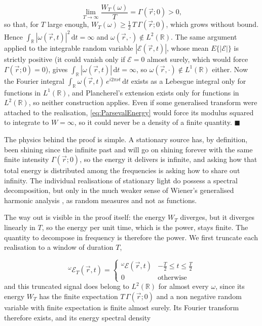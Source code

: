 		\begin{equation}
			\lim_{T\to\infty}\frac{W_{T}(\omega)}{T} = \Gamma(\vec{r};0) > 0 ,
		\end{equation}
		so that, for $T$ large enough, $W_{T}(\omega)\geq\frac{1}{2}\,T\,\Gamma(\vec{r};0)$,
		which grows without bound. Hence $\int_{\mathbb{R}}|\omega(\vec{r},t)|^{2}\,\mathrm{d}t=\infty$
		and $\omega(\vec{r},\cdot)\notin L^{2}(\mathbb{R})$. The same argument applied to the
		integrable random variable $|\mathcal{E}(\vec{r},t)|$, whose mean $E\{|\mathcal{E}|\}$ is
		strictly positive (it could vanish only if $\mathcal{E}=0$ almost surely, which would
		force $\Gamma(\vec{r};0)=0$), gives $\int_{\mathbb{R}}|\omega(\vec{r},t)|\,\mathrm{d}t=\infty$,
		so $\omega(\vec{r},\cdot)\notin L^{1}(\mathbb{R})$ either. Now the Fourier integral
		$\int_{\mathbb{R}}\omega(\vec{r},t)\,e^{i2\pi\nu t}\,\mathrm{d}t$ exists as a Lebesgue
		integral only for functions in $L^{1}(\mathbb{R})$, and Plancherel's extension exists
		only for functions in $L^{2}(\mathbb{R})$, so neither construction applies. Even if some
		generalised transform were attached to the realisation, \eqref{eq:ParsevalEnergy} would
		force its modulus squared to integrate to $W=\infty$, so it could never be a density of a
		finite quantity. $\blacksquare$

		The physics behind the proof is simple. A stationary source has, by definition, been
		shining since the infinite past and will go on shining forever with the same finite
		intensity $\Gamma(\vec{r};0)$, so the energy it delivers is infinite, and asking how that
		total energy is distributed among the frequencies is asking how to share out infinity.
		The individual realisations of stationary light do possess a spectral decomposition, but
		only in the much weaker sense of Wiener's generalised harmonic analysis
		\citep{wiener1930generalized}, as random measures and not as functions.

		The way out is visible in the proof itself: the energy $W_{T}$ diverges, but it diverges
		linearly in $T$, so the energy per unit time, which is the power, stays finite. The
		quantity to decompose in frequency is therefore the power. We first truncate each
		realisation to a window of duration $T$,

		\begin{equation}\label{eq:NearlyWiener}
			^\omega \mathcal{E}_T (\vec{r},t) = \left\{
			\begin{matrix}
				^\omega\mathcal{E}(\vec{r},t) & -\frac{T}{2}\leq t \leq \frac{T}{2}\\
				0 & \text{otherwise}
			\end{matrix} \right.
		\end{equation}
		and this truncated signal does belong to $L^{2}(\mathbb{R})$ for almost every $\omega$,
		since its energy $W_{T}$ has the finite expectation $T\,\Gamma(\vec{r};0)$ and a non
		negative random variable with finite expectation is finite almost surely. Its Fourier
		transform therefore exists, and its energy spectral density

